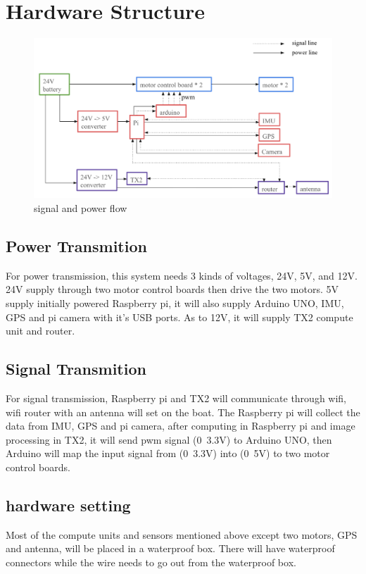 \section{Hardware Structure}

\begin{figure}[h] %
	\includegraphics[width=0.8\columnwidth]{images/hardware.png}
	\centering
	\caption{signal and power flow}
	\label{figure:hardware}
\end{figure}

\subsection{Power Transmition}

For power transmission, this system needs 3 kinds of voltages, 24V, 5V, and 12V. 24V supply through two motor control boards then drive the two motors. 5V supply initially powered Raspberry pi, it will also supply Arduino UNO, IMU, GPS and pi camera with it’s USB ports. As to 12V, it will supply TX2 compute unit and router.

\subsection{Signal Transmition}

For signal transmission, Raspberry pi and TX2 will communicate through wifi, wifi router with an antenna will set on the boat. The Raspberry pi will collect the data from IMU, GPS and pi camera, after computing in Raspberry pi and image processing in TX2, it will send pwm signal (0~3.3V) to Arduino UNO, then Arduino will map the input signal from (0~3.3V) into (0~5V) to two motor control boards.

\subsection{hardware setting}
Most of the compute units and sensors mentioned above except two motors, GPS and antenna, will be placed in a waterproof box. There will have waterproof connectors while the wire needs to go out from the waterproof box.

